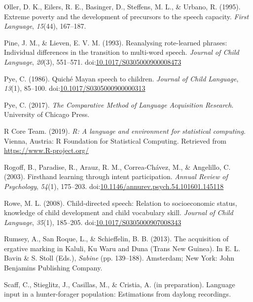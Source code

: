 \documentclass[,man,floatsintext]{apa6}
\begin{document}
\hypertarget{ref-oller1995extreme}{}
Oller, D. K., Eilers, R. E., Basinger, D., Steffens, M. L., \& Urbano,
R. (1995). Extreme poverty and the development of precursors to the
speech capacity. \emph{First Language}, \emph{15}(44), 167--187.

\hypertarget{ref-pine1993reanalysing}{}
Pine, J. M., \& Lieven, E. V. M. (1993). Reanalysing rote-learned
phrases: Individual differences in the transition to multi-word speech.
\emph{Journal of Child Language}, \emph{20}(3), 551--571.
doi:\href{https://doi.org/10.1017/S0305000900008473}{10.1017/S0305000900008473}

\hypertarget{ref-pye1986quiche}{}
Pye, C. (1986). Quiché Mayan speech to children. \emph{Journal of Child
Language}, \emph{13}(1), 85--100.
doi:\href{https://doi.org/10.1017/S0305000900000313}{10.1017/S0305000900000313}

\hypertarget{ref-pye2017comparative}{}
Pye, C. (2017). \emph{The Comparative Method of Language Acquisition
Research}. University of Chicago Press.

\hypertarget{ref-R-base}{}
R Core Team. (2019). \emph{R: A language and environment for statistical
computing}. Vienna, Austria: R Foundation for Statistical Computing.
Retrieved from \url{https://www.R-project.org/}

\hypertarget{ref-rogoff2003firsthand}{}
Rogoff, B., Paradise, R., Arauz, R. M., Correa-Chávez, M., \& Angelillo,
C. (2003). Firsthand learning through intent participation. \emph{Annual
Review of Psychology}, \emph{54}(1), 175--203.
doi:\href{https://doi.org/10.1146/annurev.psych.54.101601.145118}{10.1146/annurev.psych.54.101601.145118}

\hypertarget{ref-rowe2008child}{}
Rowe, M. L. (2008). Child-directed speech: Relation to socioeconomic
status, knowledge of child development and child vocabulary skill.
\emph{Journal of Child Language}, \emph{35}(1), 185--205.
doi:\href{https://doi.org/10.1017/S0305000907008343}{10.1017/S0305000907008343}

\hypertarget{ref-rumsey2013ergative}{}
Rumsey, A., San Roque, L., \& Schieffelin, B. B. (2013). The acquisition
of ergative marking in Kaluli, Ku Waru and Duna (Trans New Guinea). In
E. L. Bavin \& S. Stoll (Eds.), \emph{Sabine} (pp. 139--188). Amsterdam;
New York: John Benjamins Publishing Company.

\hypertarget{ref-scaffIPlanguage}{}
Scaff, C., Stieglitz, J., Casillas, M., \& Cristia, A. (in preparation).
Language input in a hunter-forager population: Estimations from daylong
recordings.
\end{document}
